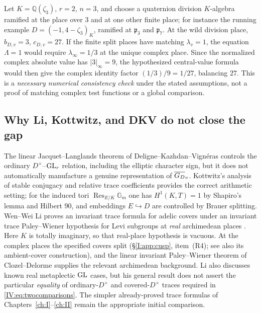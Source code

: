 \begin{example}
\label{IV:ex:ranktwoledger}
Let $K=\mathbb Q(\zeta_3)$, $r=2$, $n=3$, and choose a
quaternion division $K$-algebra ramified at the place over $3$
and at one other finite place; for instance the running example
$D=(-1,4-\zeta_3)_K$, ramified at $\mathfrak p_3$ and $\mathfrak p_7$.  At the wild division place,
$b_{D,v}=3$, $c_{D,v}=27$.  If the finite split places have
matching $\lambda_v=1$, the equation $\Lambda=1$ would require
$\lambda_\infty=1/3$ at the unique complex place.
Since the normalized complex absolute value has
$|3|_\infty=9$, the hypothesized central-value formula would then
give the complex identity factor $(1/3)/9=1/27$, balancing
$27$.  This is a \emph{necessary numerical consistency check}
under the stated assumptions, not a proof of matching complex
test functions or a global comparison.
\end{example}

\subsection{Why Li, Kottwitz, and DKV do not close the gap}\label{IV:subsec:litroute}
The linear Jacquet--Langlands theorem of
Deligne--Kazhdan--Vign\'eras \cite{DKV84} controls the ordinary
$D^\times$--$\operatorname{GL}_r$ relation, including the elliptic character
sign, but it does not automatically manufacture a genuine
representation of $\overline{G_D}_v$.  Kottwitz's analysis of stable
conjugacy and relative trace coefficients \cite{Kot84}
provides the correct arithmetic setting; for the induced tori
$\operatorname{Res}_{E/K}\mathbb G_m$ one has
$H^1(K,T)=1$ by Shapiro's lemma and Hilbert 90, and embeddings
$E\hookrightarrow D$ are controlled by Brauer splitting.
Wen--Wei Li proves an invariant trace formula for adelic covers
under an invariant trace Paley--Wiener hypothesis for Levi subgroups
at \emph{real} archimedean places \cite{Li14}.  Here $K$ is totally
imaginary, so that real-place hypothesis is vacuous.  At the complex
places the specified covers split (\S\ref{I:app:cusp}, item~(R4);
see also its ambient-cover construction), and the linear invariant Paley--Wiener theorem
of Clozel--Delorme \cite{CD84} supplies the relevant
archimedean background.  Li also discusses known real metaplectic
$\operatorname{GL}$ cases, but his general result does not assert the particular
\emph{equality} of ordinary-$D^\times$ and covered-$D^\times$
traces required in \eqref{IV:eq:twocomparisons}.  The simpler already-proved trace formulas
of Chapters~\ref{ch:I}--\ref{ch:II} remain the appropriate initial comparison.

